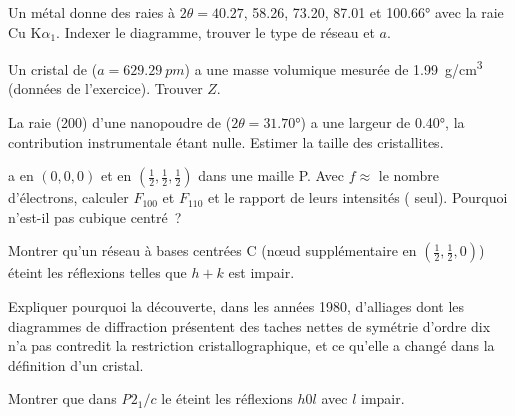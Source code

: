 \begin{exercise}[$\star\star$]\label{exo:b3:x-ray-diffraction:5}
Un métal donne des raies à $2\theta = 40.27$, 58.26, 73.20, 87.01 et
\ang{100.66} avec la raie Cu
K$\alpha_1$. Indexer le diagramme, trouver le type de réseau et $a$.
\end{exercise}

\begin{exercise}[$\star\star$]\label{exo:b3:x-ray-diffraction:6}
Un cristal de  ($a = \qty{629.29}{pm}$) a une masse volumique
mesurée de
\qty{1.99}{g/cm^3} (données de l'exercice). Trouver $Z$.
\end{exercise}

\begin{exercise}[$\star\star$]\label{exo:b3:x-ray-diffraction:7}
La raie (200) d'une nanopoudre de  ($2\theta = \ang{31.70}$) a
une largeur de \ang{0.40}, la contribution instrumentale étant nulle.
Estimer la taille des cristallites.
\end{exercise}

\begin{exercise}[$\star\star$]\label{exo:b3:x-ray-diffraction:8}
 a  en $(0,0,0)$ et  en $(\frac12,\frac12,\frac12)$ dans une maille P. Avec $f
\approx$ le nombre d'électrons, calculer $F_{100}$ et $F_{110}$ et le
rapport de leurs intensités ( seul). Pourquoi
 n'est-il pas cubique centré~?
\end{exercise}

\begin{exercise}[$\star\star$]\label{exo:b3:x-ray-diffraction:9}
Montrer qu'un réseau à bases centrées C (nœud supplémentaire en
$(\frac12,\frac12,0)$) éteint les
réflexions telles que $h + k$ est impair.
\end{exercise}

\begin{exercise}[$\star\star\star$]\label{exo:b3:x-ray-diffraction:10}
Expliquer pourquoi la découverte, dans les années 1980, d'alliages dont
les diagrammes de diffraction présentent des taches nettes de symétrie
d'ordre dix n'a pas contredit la restriction cristallographique, et ce
qu'elle a changé dans la définition d'un cristal.
\end{exercise}

\begin{exercise}[$\star\star\star$]\label{exo:b3:x-ray-diffraction:11}
Montrer que dans \textit{P}$2_1/c$ le  éteint les
réflexions $h0l$ avec $l$
impair.
\end{exercise}

